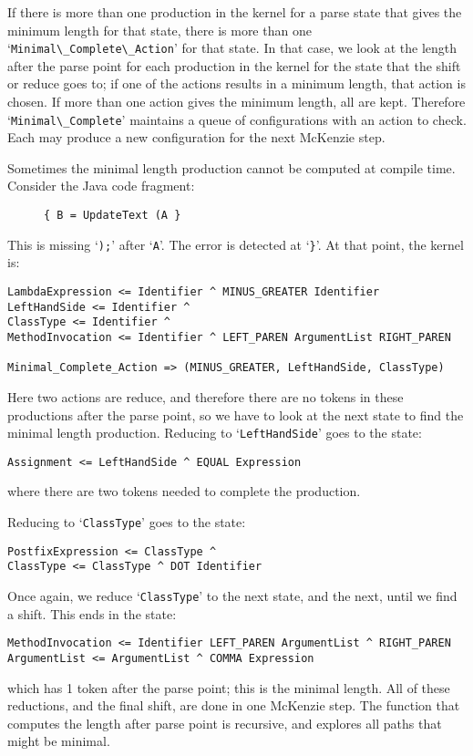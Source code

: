 \documentclass{article}
\newcommand{\code}[1]{`\lstinline|#1|'}
\begin{document}
If there is more than one production in the kernel for a parse state
that gives the minimum length for that state, there is more than one\\
\code{Minimal\_Complete\_Action} for that state. In that case, we look
at the length after the parse point for each production in the kernel
for the state that the shift or reduce goes to; if one of the actions
results in a minimum length, that action is chosen. If more than one
action gives the minimum length, all are kept. Therefore
\code{Minimal\_Complete} maintains a queue of configurations with an
action to check. Each may produce a new configuration for the next
McKenzie step.

Sometimes the minimal length production cannot be computed at compile
time. Consider the Java code fragment:
\begin{figure}[H]
  \small{
    \begin{lstlisting}
{ B = UpdateText (A }
    \end{lstlisting}
    }
\caption{}
\label{ex:recursive_length_after_dot}
\end{figure}
This is missing \code{);} after \code{A}. The error is detected at
`\lstinline|}|'. At that point, the kernel is:
\begin{verbatim}
LambdaExpression <= Identifier ^ MINUS_GREATER Identifier
LeftHandSide <= Identifier ^
ClassType <= Identifier ^
MethodInvocation <= Identifier ^ LEFT_PAREN ArgumentList RIGHT_PAREN

Minimal_Complete_Action => (MINUS_GREATER, LeftHandSide, ClassType)
\end{verbatim}
Here two actions are reduce, and therefore there are no tokens in
these productions after the parse point, so we have to look at the
next state to find the minimal length production. Reducing to
\code{LeftHandSide} goes to the state:
\begin{verbatim}
Assignment <= LeftHandSide ^ EQUAL Expression
\end{verbatim}
where there are two tokens needed to complete the production.

Reducing to \code{ClassType} goes to the state:
\begin{verbatim}
PostfixExpression <= ClassType ^
ClassType <= ClassType ^ DOT Identifier
\end{verbatim}
Once again, we reduce \code{ClassType} to the next state, and the
next, until we find a shift. This ends in the state:
\begin{verbatim}
MethodInvocation <= Identifier LEFT_PAREN ArgumentList ^ RIGHT_PAREN
ArgumentList <= ArgumentList ^ COMMA Expression
\end{verbatim}
which has 1 token after the parse point; this is the minimal length.
All of these reductions, and the final shift, are done in one McKenzie
step. The function that computes the length after parse point is
recursive, and explores all paths that might be minimal.
\end{document}
